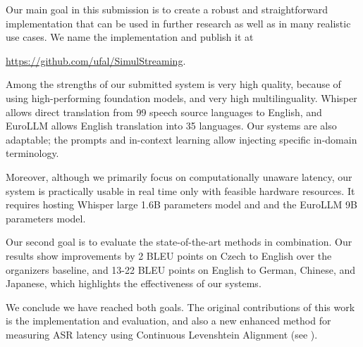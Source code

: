 \documentclass[11pt]{article}
\begin{document}

Our main goal in this submission is to create a robust and straightforward implementation that can be used in further research as well as in many realistic use cases. We name the implementation \textbf{\SimulStreaming{}} and publish it at 
\centerline{\url{https://github.com/ufal/SimulStreaming}.}

Among the strengths of our submitted system is very high quality, because of using high-performing foundation models, and very high multilinguality. Whisper allows direct translation from 99 speech source languages to English, and EuroLLM allows English translation into 35 languages. Our systems are also adaptable; the prompts and in-context learning allow injecting specific in-domain terminology.

Moreover, although we primarily focus on computationally unaware latency, our system is practically usable in real time only with feasible hardware resources. It requires hosting Whisper large 1.6B parameters model and  and the EuroLLM 9B parameters model. 

Our second goal is to evaluate the state-of-the-art methods in combination. Our results show improvements by 2 BLEU points on Czech to English over the organizers baseline, and 13-22 BLEU points on English to German, Chinese, and Japanese, which highlights the effectiveness of our systems.

We conclude we have reached both goals. The original contributions of this work is the \SimulStreaming{} implementation and evaluation, and also a new enhanced method for measuring ASR latency using Continuous Levenshtein Alignment (see ).
\end{document}
